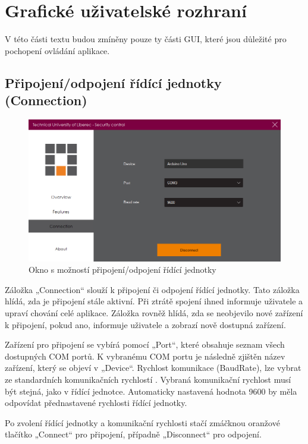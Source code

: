 \documentclass[FM,DP]{tulthesis}  %
\begin{document}
\section{Grafické uživatelské rozhraní}
V této části textu budou zmíněny pouze ty části GUI, které jsou důležité pro pochopení ovládání aplikace.

\subsection{Připojení/odpojení řídící jednotky (Connection)}

\begin{figure}[H]
\begin{center}
\includegraphics[width=\textwidth]{images/connection.png}
\caption{Okno s možností připojení/odpojení řídící jednotky}
\label{image}
\end{center}
\end{figure}

Záložka „Connection“ slouží k připojení či odpojení řídící jednotky. Tato záložka hlídá, zda je připojení stále aktivní. Při ztrátě spojení ihned informuje uživatele a upraví chování celé aplikace. Záložka rovněž hlídá, zda se neobjevilo nové zařízení k připojení, pokud ano, informuje uživatele a zobrazí nově dostupná zařízení. 

Zařízení pro připojení se vybírá pomocí „Port“, které obsahuje seznam všech dostupných COM portů. K vybranému COM portu je následně zjištěn název zařízení, který se objeví v „Device“. Rychlost komunikace (BaudRate), lze vybrat ze standardních komunikačních rychlostí \cite{BaudRates}. Vybraná komunikační rychlost musí být stejná, jako v řídící jednotce. Automaticky nastavená hodnota 9600 by měla odpovídat přednastavené rychlosti řídící jednotky. 

Po zvolení řídící jednotky a komunikační rychlosti stačí zmáčknou oranžové tlačítko „Connect“ pro připojení, případně „Disconnect“ pro odpojení.  
\end{document}
